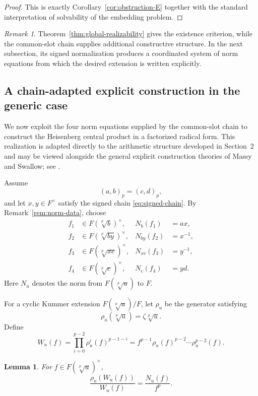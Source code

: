 \documentclass[12pt]{amsart}
\newtheorem{lemma}[theorem]{Lemma}
\theoremstyle{definition}
\theoremstyle{remark}
\newtheorem{remark}[theorem]{Remark}
\begin{document}
\begin{proof}
This is exactly Corollary~\ref{cor:obstruction-E} together with the standard
interpretation of solvability of the embedding problem.
\end{proof}

\begin{remark}
Theorem~\ref{thm:global-realizability} gives the existence criterion, while
the common-slot chain supplies additional constructive structure. In the
next subsection, its signed normalization produces a coordinated system of
norm equations from which the desired extension is written explicitly.
\end{remark}

\subsection{A chain-adapted explicit construction in the generic case}
\label{subsec:explicit}

We now exploit the four norm equations supplied by the common-slot chain to
construct the Heisenberg central product in a factorized radical form. This
realization is adapted directly to the arithmetic structure developed in
Section~2 and may be viewed alongside the general explicit construction
theories of Massy and Swallow; see
\cite{Massy,SwallowConstructible,SwallowCentral}.

Assume
\[
 (a,b)_p=(c,d)_p,
\]
and let $x,y\in F^\times$ satisfy the signed chain
\eqref{eq:signed-chain}. By Remark~\ref{rem:norm-data}, choose
\begin{align*}
 f_1&\in F(\sqrt[p]{b})^\times,
 &N_b(f_1)&=ax,\\
 f_2&\in F(\sqrt[p]{by})^\times,
 &N_{by}(f_2)&=x^{-1},\\
 f_3&\in F(\sqrt[p]{xc})^\times,
 &N_{xc}(f_3)&=y^{-1},\\
 f_4&\in F(\sqrt[p]{c})^\times,
 &N_c(f_4)&=yd.
\end{align*}
Here $N_u$ denotes the norm from $F(\sqrt[p]{u})$ to $F$.

For a cyclic Kummer extension $F(\sqrt[p]{u})/F$, let $\rho_u$ be the
generator satisfying
\[
 \rho_u(\sqrt[p]{u})=\zeta\sqrt[p]{u}.
\]
Define
\begin{equation}\label{eq:W-def}
 W_u(f)=\prod_{i=0}^{p-2}\rho_u^i(f)^{p-1-i}
 =f^{p-1}\rho_u(f)^{p-2}\cdots\rho_u^{p-2}(f).
\end{equation}

\begin{lemma}\label{lem:W-ratio}
For $f\in F(\sqrt[p]{u})^\times$,
\[
 \frac{\rho_u(W_u(f))}{W_u(f)}=\frac{N_u(f)}{f^p}.
\]
\end{lemma}
\end{document}
